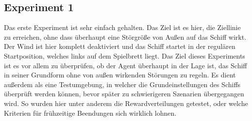 \documentclass[]{iat}
\begin{document}
\subsection*{Experiment 1}
Das erste Experiment ist sehr einfach gehalten. Das Ziel ist es hier, die Ziellinie zu erreichen, ohne dass überhaupt eine Störgröße von Außen auf das Schiff wirkt. Der Wind ist hier komplett deaktiviert und das Schiff startet in der regulären Startposition, welches links auf dem Spielbrett liegt. Das Ziel dieses Experiments ist es vor allem zu überprüfen, ob der Agent überhaupt in der Lage ist, das Schiff in seiner Grundform ohne von außen wirkenden Störungen zu regeln. Es dient außerdem als eine Testumgebung, in welcher die Grundeinstellungen des Schiffs überprüft werden können, bevor später zu schwierigeren Szenarien übergegangen wird. So wurden hier unter anderem die Rewardverteilungen getestet, oder welche Kriterien für frühzeitige Beendungen sich wirklich lohnen.
\end{document}
